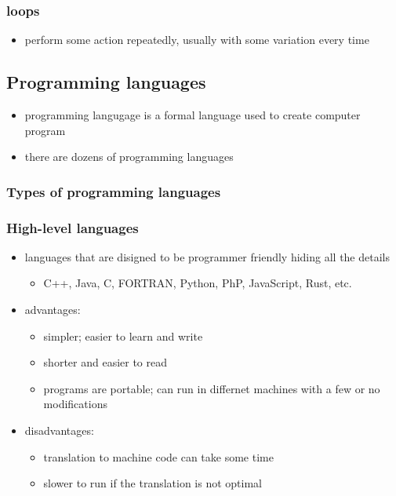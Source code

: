 \documentclass[11pt]{article}
\providecommand{\tightlist}{%
      \setlength{\itemsep}{0pt}\setlength{\parskip}{0pt}}
\begin{document}
\hypertarget{loops}{%
\subsubsection{loops}\label{loops}}

\begin{itemize}
\tightlist
\item
  perform some action repeatedly, usually with some variation every time
\end{itemize}

    \hypertarget{programming-languages}{%
\subsection{Programming languages}\label{programming-languages}}

\begin{itemize}
\tightlist
\item
  programming langugage is a formal language used to create computer
  program
\item
  there are dozens of programming languages
\end{itemize}

\hypertarget{types-of-programming-languages}{%
\subsubsection{Types of programming
languages}\label{types-of-programming-languages}}

\hypertarget{high-level-languages}{%
\subsubsection{High-level languages}\label{high-level-languages}}

\begin{itemize}
\tightlist
\item
  languages that are disigned to be programmer friendly hiding all the
  details

  \begin{itemize}
  \tightlist
  \item
    C++, Java, C, FORTRAN, Python, PhP, JavaScript, Rust, etc.
  \end{itemize}
\item
  advantages:

  \begin{itemize}
  \tightlist
  \item
    simpler; easier to learn and write
  \item
    shorter and easier to read
  \item
    programs are portable; can run in differnet machines with a few or
    no modifications
  \end{itemize}
\item
  disadvantages:

  \begin{itemize}
  \tightlist
  \item
    translation to machine code can take some time
  \item
    slower to run if the translation is not optimal
  \end{itemize}
\end{itemize}
\end{document}
